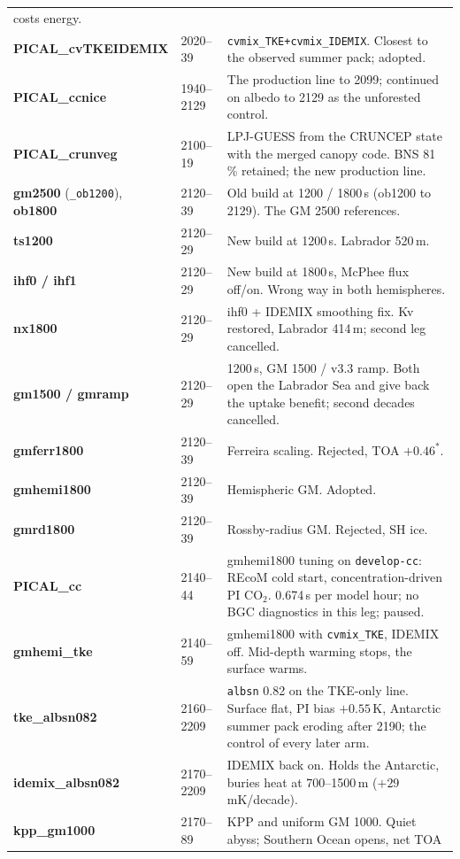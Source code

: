 \documentclass[10pt]{article}
\begin{document}
{\begin{longtable}{p{3.3cm}p{2.3cm}p{10.2cm}}
costs energy. \\
\textbf{PICAL\_cvTKEIDEMIX} & 2020--39 & \texttt{cvmix\_TKE+cvmix\_IDEMIX}. Closest to the
observed summer pack; adopted. \\
\addlinespace
\textbf{PICAL\_ccnice}   & 1940--2129 & The production line to 2099; continued on albedo to
2129 as the unforested control. \\
\textbf{PICAL\_crunveg}  & 2100--19 & LPJ-GUESS from the CRUNCEP state with the merged canopy code.
BNS 81\,\% retained; the new production line. \\
\addlinespace
\textbf{gm2500} (\texttt{\_ob1200}), \textbf{ob1800} & 2120--39 & Old build at 1200 / 1800\,s
(ob1200 to 2129). The GM 2500 references. \\
\textbf{ts1200}          & 2120--29 & New build at 1200\,s. Labrador 520\,m. \\
\textbf{ihf0 / ihf1}     & 2120--29 & New build at 1800\,s, McPhee flux off/on. Wrong way in both
hemispheres. \\
\textbf{nx1800}          & 2120--29 & ihf0 + IDEMIX smoothing fix. Kv restored, Labrador 414\,m;
second leg cancelled. \\
\textbf{gm1500 / gmramp} & 2120--29 & 1200\,s, GM 1500 / v3.3 ramp. Both open the Labrador Sea and
give back the uptake benefit; second decades cancelled. \\
\textbf{gmferr1800}      & 2120--39 & Ferreira scaling. Rejected, TOA $+0.46^*$. \\
\textbf{gmhemi1800}      & 2120--39 & Hemispheric GM. Adopted. \\
\textbf{gmrd1800}        & 2120--39 & Rossby-radius GM. Rejected, SH ice. \\
\textbf{PICAL\_cc}       & 2140--44 & gmhemi1800 tuning on \texttt{develop-cc}: REcoM cold start,
concentration-driven PI CO$_2$. 0.674\,s per model hour; no BGC diagnostics in this leg; paused. \\
\textbf{gmhemi\_tke}     & 2140--59 & gmhemi1800 with \texttt{cvmix\_TKE}, IDEMIX off. Mid-depth warming
stops, the surface warms. \\
\textbf{tke\_albsn082}   & 2160--2209 & \texttt{albsn} 0.82 on the TKE-only line. Surface flat, PI bias
$+0.55$\,K, Antarctic summer pack eroding after 2190; the control of every later arm. \\
\textbf{idemix\_albsn082} & 2170--2209 & IDEMIX back on. Holds the Antarctic, buries heat at
700--1500\,m ($+29$\,mK/decade). \\
\textbf{kpp\_gm1000}    & 2170--89 & KPP and uniform GM 1000. Quiet abyss; Southern Ocean opens, net TOA

\end{longtable}}
\end{document}
